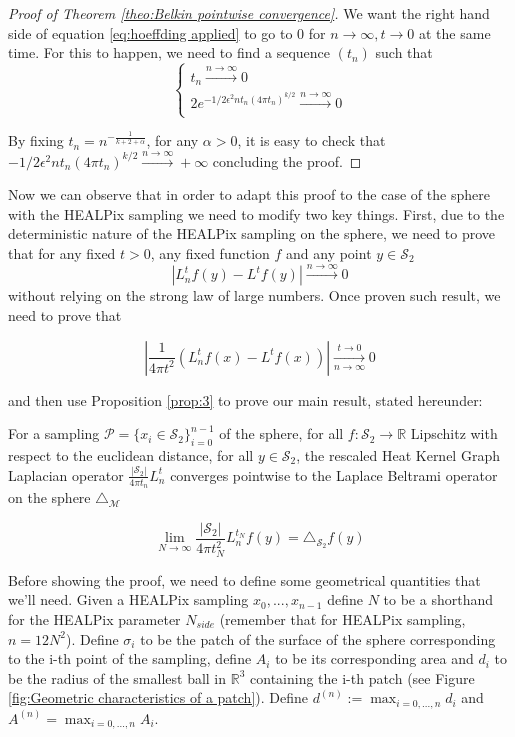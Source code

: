 \begin{proof}[Proof of Theorem \ref{theo:Belkin pointwise convergence}]
We want the right hand side of equation \ref{eq:hoeffding applied} to go to $0$ for $n\to\infty, t\to0$ at the same time. For this to happen, we need to find a sequence $(t_n)$ such that 
$$\begin{cases}
t_n\xrightarrow{n\to\infty}0\\
2 e^{-1 / 2 \epsilon^{2} n t_n(4 \pi t_n)^{k / 2}}\xrightarrow{n\to\infty}0\\
\end{cases}$$

By fixing $t_n=n^{-\frac{1}{k+2+\alpha}}$, for any $\alpha>0$, it is easy to check that $-1 / 2 \epsilon^{2} n t_n(4 \pi t_n)^{k / 2}\xrightarrow{n\to\infty}+\infty$ concluding the proof.

\end{proof}

Now we can observe that in order to adapt this proof to the case of the sphere with the HEALPix sampling  we need to modify two key things. First, due to the deterministic nature of the HEALPix sampling on the sphere, we need to prove that for any fixed $t>0$, any fixed function $f$ and any point $y\in\mathcal S_2$ 
$$\left|L_n^tf(y)-L^tf(y)\right|\xrightarrow{n\to \infty} 0$$
without relying on the strong law of large numbers. Once proven such result, we need to prove that

$$\left|\frac{1}{4\pi t^2}\left(L_n^tf(x) - L^tf(x)\right)\right|\xrightarrow[n\to \infty]{t\to 0}0$$

and then use Proposition \ref{prop:3} to prove our main result, stated hereunder:
\vspace{1cm}
\begin{theorem}
	For a sampling $\mathcal P = \{x_i\in\mathcal S_2\}_{i=0}^{n-1}$ of the sphere, for all $f: \mathcal S_2 \rightarrow \mathbb R$ Lipschitz with respect to the euclidean distance, for all $y\in\mathcal S_2$, the rescaled Heat Kernel Graph Laplacian operator $\frac{|\mathcal S_2|}{4\pi t_n}L^t_n$ converges pointwise to the Laplace Beltrami operator on the sphere $\triangle_{\mathcal M}$
	
	$$ \lim_{N\to\infty}\frac{|\mathcal S_2|}{4\pi t_N^2} L_n^{t_N}f(y) =  \triangle_{\mathcal S_2}f(y) $$
	\label{theo:pointwise convergence in the healpix case}
\end{theorem}
\vspace{1cm}

Before showing the proof, we need to define some geometrical quantities that we'll need.
Given a HEALPix sampling $x_0, ..., x_{n-1}$ define $N$ to be a shorthand for the HEALPix parameter $N_{side}$ (remember that for HEALPix sampling, $n=12N^2$). Define $\sigma_i$ to be the patch of the surface of the sphere corresponding to the i-th point of the sampling, define $A_i$ to be its corresponding area and $d_i$ to be the radius of the smallest ball in $\mathbb R^3$ containing the i-th patch (see Figure \ref{fig:Geometric characteristics of a patch}). Define $d^{(n)} := \max_{i=0, ..., n}d_i$ and $A^{(n)}=\max_{i=0, ..., n}A_i$.\\

